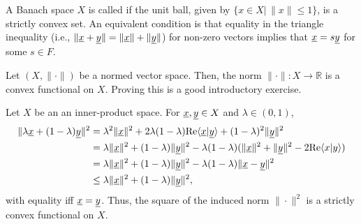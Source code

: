 \begin{definition}
A Banach space $X$ is called  if the unit ball,  given by $\{ x\in X | \, \| x \| \leq 1 \}$, is a strictly convex set.
An equivalent condition is that equality in the triangle inequality (i.e., $\| \underline{x} + \underline{y} \| = \| \underline{x} \| + \| \underline{y} \|$) for non-zero vectors implies that $ \underline{x} = s \underline{y} $ for some $s\in F$.
\end{definition}

\begin{example}
Let $(X,\|\cdot\|)$ be a normed vector space.
Then, the norm $\| \cdot \| \colon X \rightarrow \mathbb{R}$ is a convex functional on $X$.
Proving this is a good introductory exercise.
\end{example}

\begin{example}
Let $X$ be an an inner-product space. For $\underline{x},\underline{y} \in X$ and $\lambda \in (0,1)$,
\begin{align*}
\|\lambda \underline x + (1-\lambda) \underline y \|^2
&= \lambda^2 \| \underline x\|^2 + 2\lambda(1-\lambda) \mathrm{Re} \langle \underline x |  \underline y \rangle + (1-\lambda)^2 \|\underline y\|^2 \\
&= \lambda \| \underline x\|^2 + (1-\lambda)\|\underline y\|^2 - \lambda (1-\lambda) (\|\underline x\|^2+\|\underline y\|^2-2 \mathrm{Re} \langle x | y \rangle)\\
&= \lambda \| \underline x\|^2 + (1-\lambda)\|\underline y\|^2 - \lambda (1-\lambda) \|\underline x - \underline y\|^2 \\
&\leq \lambda \| \underline x\|^2 + (1-\lambda)\|\underline y\|^2,
\end{align*}
with equality iff $\underline{x}=\underline{y}$.
Thus, the square of the induced norm $\| \cdot \|^2$ is a strictly convex functional on $X$.
\end{example}

